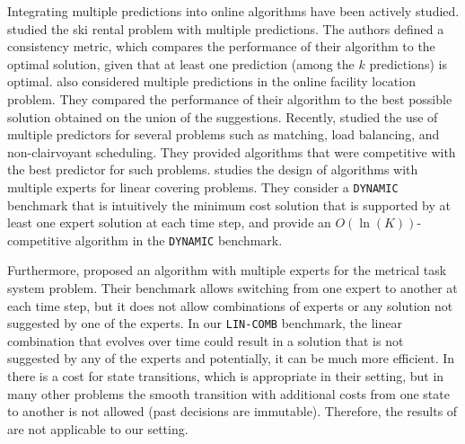 Integrating multiple predictions into online algorithms have been actively studied.
\cite{GollapudiPanigrahi19:skirental-multiple-predictions} studied the ski rental problem with multiple predictions.
The authors defined a consistency metric, which compares the performance of their algorithm to the optimal solution, given that at least one prediction (among the $k$ predictions) is optimal.
\cite{AlmanzaChierichetti21:Online-Facility} also considered multiple predictions in the online facility location problem.
They compared the performance of their algorithm to the best possible solution obtained on the union of the suggestions. Recently, \cite{DinitzIm:Algorithms-with} studied the use of multiple predictors for several problems such as matching, load balancing, and non-clairvoyant scheduling. They provided algorithms that were competitive with the best predictor for such problems.
\cite{AnandGe22:Online-Algorithms} studies the design of algorithms with multiple experts for linear covering problems.
They consider a \texttt{DYNAMIC} benchmark that is intuitively
the minimum cost solution that is supported by at least one expert solution at each time step, 
and provide an $O(\ln(K))$-competitive algorithm in the \texttt{DYNAMIC} benchmark.


Furthermore, \cite{AntoniosEtAll23:mixing-predictions-metric-algorithms} proposed an algorithm with multiple experts for the metrical task system problem. Their benchmark allows switching from one expert to another at each time step, but it does not allow combinations of experts or any solution not suggested by one of the experts. In our \texttt{LIN-COMB} benchmark, the linear combination that evolves over time could result in a solution that is not suggested by any of the experts and potentially, it can be much more efficient. In \cite{AntoniosEtAll23:mixing-predictions-metric-algorithms} there is a cost for state transitions, which is appropriate in their setting, but in many other problems the smooth transition with additional costs from one state to another is not allowed (past decisions are immutable). Therefore, the results of \cite{AntoniosEtAll23:mixing-predictions-metric-algorithms} are not applicable to our setting.

